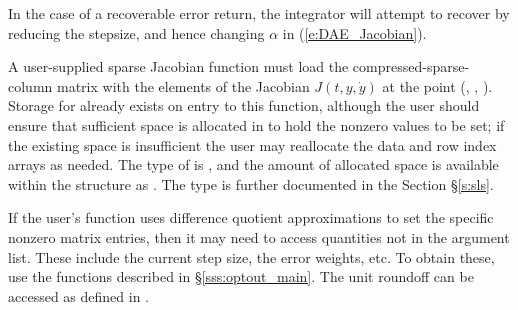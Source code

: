 {{  In the case of a recoverable error return, 
  the integrator will attempt to recover by reducing the stepsize,
  and hence changing $\alpha$ in (\ref{e:DAE_Jacobian}).
}
{
  A user-supplied sparse Jacobian function must load the
  compressed-sparse-column matrix  with the elements of the
  Jacobian $J(t,y,\dot{y})$ at the point (, , ).
  Storage for  already exists on entry to this function,
  although the user should ensure that sufficient space is allocated
  in  to hold the nonzero values to be set; if the existing
  space is insufficient the user may reallocate the data and row index
  arrays as needed.  The type of  is , and the
  amount of allocated space is available within the 
  structure as .  The  type is further documented
  in the Section \S\ref{s:sls}. 
 
  If the user's  function uses difference quotient
  approximations to set the specific nonzero matrix entries, then it
  may need to access quantities not in the argument list. These
  include the current step size, the error weights, etc.  To obtain
  these, use the  functions described in
  \S\ref{sss:optout_main}. The unit roundoff can be accessed as
   defined in . 
}
}
